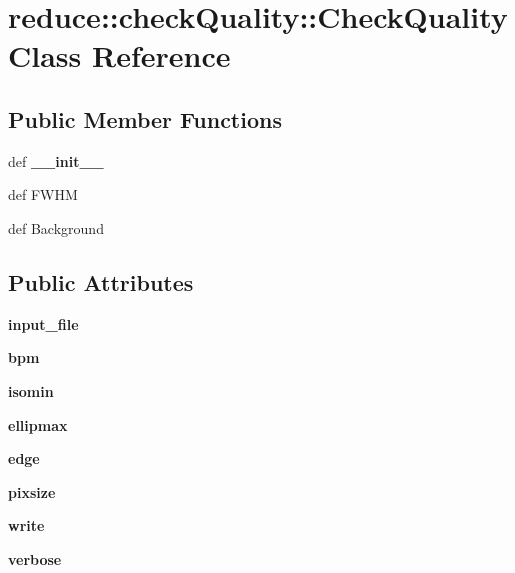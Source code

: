 \section{reduce::check\-Quality::Check\-Quality Class Reference}
\label{classreduce_1_1checkQuality_1_1CheckQuality}
\subsection*{Public Member Functions}
\begin{CompactItemize}
\item 
def \textbf{\_\-\_\-init\_\-\_\-}\label{classreduce_1_1checkQuality_1_1CheckQuality_f08b48db393ac7339afaba76f40d3598}

\item 
def {\bfestimate\-FWHM}
\item 
def {\bfestimate\-Background}
\end{CompactItemize}
\subsection*{Public Attributes}
\begin{CompactItemize}
\item 
\textbf{input\_\-file}\label{classreduce_1_1checkQuality_1_1CheckQuality_8474c9a2e7fa79bbe687ea047b039602}

\item 
\textbf{bpm}\label{classreduce_1_1checkQuality_1_1CheckQuality_07e029405fbdd619aea7f644b64f96fc}

\item 
\textbf{isomin}\label{classreduce_1_1checkQuality_1_1CheckQuality_56d3fd8126f5e91a24fe19971de4a11a}

\item 
\textbf{ellipmax}\label{classreduce_1_1checkQuality_1_1CheckQuality_8791045b1921dca037b1f3d045c2a068}

\item 
\textbf{edge}\label{classreduce_1_1checkQuality_1_1CheckQuality_4c1f10350c348dd6309515a43e368ddc}

\item 
\textbf{pixsize}\label{classreduce_1_1checkQuality_1_1CheckQuality_df2edc72f71628f48c2d69a1dc1c0119}

\item 
\textbf{write}\label{classreduce_1_1checkQuality_1_1CheckQuality_6bb17eaf3177308b800d21ddb3c06b56}

\item 
\textbf{verbose}\label{classreduce_1_1checkQuality_1_1CheckQuality_27aa27cb1c78fa2349dabb224cdb932a}

\end{CompactItemize}


